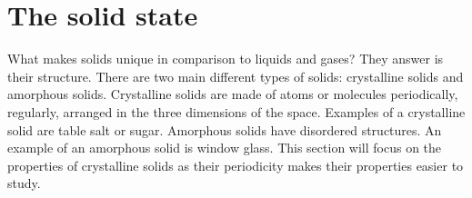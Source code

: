 \documentclass[main.tex]{subfiles}
\begin{document}
\newpage
\section{The solid state}
What makes solids unique in comparison to liquids and gases? They answer is their structure. There are two main different types of solids: crystalline solids and amorphous solids. Crystalline solids are made of atoms or molecules periodically, regularly, arranged in the three dimensions of the space. Examples of a crystalline solid are table salt or sugar. Amorphous solids have disordered structures. An example of an amorphous solid is window glass. This section will focus on the properties of crystalline solids as their periodicity makes their properties easier to study.
\sloppy 
\end{document}
